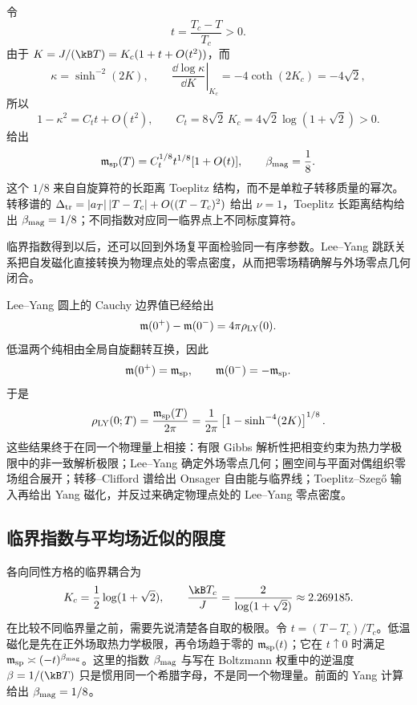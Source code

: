 令
\[
 t=\frac{T_c-T}{T_c}>0.
\]
由于 \(K=J/(\kB T)=K_c(1+t+O(t^2))\)，而
\[
 \kappa=\sinh^{-2}(2K),
 \qquad
 \left.\frac{\dd\log\kappa}{\dd K}\right|_{K_c}
 =-4\coth(2K_c)=-4\sqrt2,
\]
所以
\begin{equation}
 1-\kappa^2=C_t t+O(t^2),
 \qquad
 C_t=8\sqrt2\,K_c
 =4\sqrt2\log(1+\sqrt2)>0.
 \label{eq:phys-sm-yang-kappa-slope}
\end{equation}
 给出
\begin{equation}
 \mathfrak m_{\rm sp}(T)
 =C_t^{1/8}t^{1/8}[1+O(t)],
 \qquad
 \beta_{\rm mag}=\frac18.
 \label{eq:phys-sm-yang-beta-exponent}
\end{equation}
这个 \(1/8\) 来自自旋算符的长距离 Toeplitz 结构，而不是单粒子转移质量的幂次。转移谱的 \(\Delta_{\rm tr}=|a_T|\,|T-T_c|+O((T-T_c)^2)\) 给出 \(\nu=1\)，Toeplitz 长距离结构给出 \(\beta_{\rm mag}=1/8\)；不同指数对应同一临界点上不同标度算符。

临界指数得到以后，还可以回到外场复平面检验同一有序参数。Lee--Yang 跳跃关系把自发磁化直接转换为物理点处的零点密度，从而把零场精确解与外场零点几何闭合。

Lee--Yang 圆上的 Cauchy 边界值已经给出
\[
 \mathfrak m(0^+)-\mathfrak m(0^-)=4\pi\rho_{\rm LY}(0).
\]
低温两个纯相由全局自旋翻转互换，因此
\[
 \mathfrak m(0^+)=\mathfrak m_{\rm sp},
 \qquad
 \mathfrak m(0^-)=-\mathfrak m_{\rm sp}.
\]
于是
\begin{equation}
 \rho_{\rm LY}(0;T)
 =\frac{\mathfrak m_{\rm sp}(T)}{2\pi}
 =\frac{1}{2\pi}
 \left[1-\sinh^{-4}(2K)\right]^{1/8}.
 \label{eq:phys-sm-2d-g0}
\end{equation}
这些结果终于在同一个物理量上相接：有限 Gibbs 解析性把相变约束为热力学极限中的非一致解析极限；Lee--Yang 确定外场零点几何；圈空间与平面对偶组织零场组合展开；转移--Clifford 谱给出 Onsager 自由能与临界线；Toeplitz--Szegő 输入再给出 Yang 磁化，并反过来确定物理点处的 Lee--Yang 零点密度。

\subsection{临界指数与平均场近似的限度}
\label{sec:ising-experiments}

各向同性方格的临界耦合为
\[
K_c=\frac12\log(1+\sqrt2),\qquad
\frac{\kB T_c}{J}=\frac{2}{\log(1+\sqrt2)}\approx2.269185.
\]
在比较不同临界量之前，需要先说清楚各自取的极限。令 \(t=(T-T_c)/T_c\)。低温磁化是先在正外场取热力学极限，再令场趋于零的 \(\mathfrak m_{\rm sp}(t)\)；它在 \(t\uparrow0\) 时满足 \(\mathfrak m_{\rm sp}\asymp(-t)^{\beta_{\rm mag}}\)。这里的指数 \(\beta_{\rm mag}\) 与写在 Boltzmann 权重中的逆温度 \(\beta=1/(\kB T)\) 只是惯用同一个希腊字母，不是同一个物理量。前面的 Yang 计算给出 \(\beta_{\rm mag}=1/8\)。

